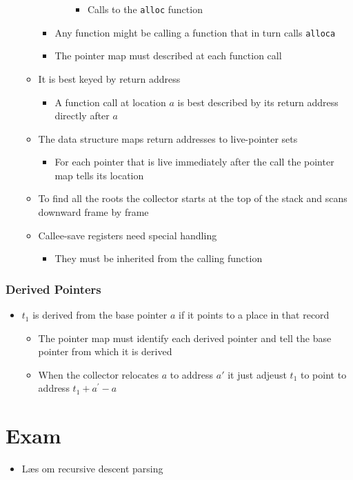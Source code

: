 \documentclass[11pt]{article}
\begin{document}
\begin{itemize}
\begin{itemize}
\begin{itemize}
\begin{itemize}
\begin{itemize}
\item Calls to the \texttt{alloc} function
\end{itemize}
\end{itemize}
\item Any function might be calling a function that in turn calls \texttt{alloca}
\item The pointer map must described at each function call
\end{itemize}
\item It is best keyed by return address
\begin{itemize}
\item A function call at location \(a\) is best described by its return address directly after \(a\)
\end{itemize}
\item The data structure maps  return addresses to live-pointer sets
\begin{itemize}
\item For each pointer that is live immediately after the call the pointer map tells its location
\end{itemize}
\item To find all the roots the collector starts at the top of the stack and scans downward frame by frame
\item Callee-save registers need special handling
\begin{itemize}
\item They must be inherited from the calling function
\end{itemize}
\end{itemize}
\end{itemize}

\subsubsection{Derived Pointers}
\label{sec:org0ba3f56}
\begin{itemize}
\item \(t_1\) is derived from the base pointer \(a\) if it points to a place in that record
\begin{itemize}
\item The pointer map must identify each derived pointer and tell the base pointer from which it is derived
\item When the collector relocates \(a\) to address \(a'\) it just adjeust \(t_1\) to point to address \(t_1+a^{'}-a\)
\end{itemize}
\end{itemize}

\section{Exam}
\label{sec:org18d72b2}
\begin{itemize}
\item Læs om recursive descent parsing
\end{itemize}
\end{document}
